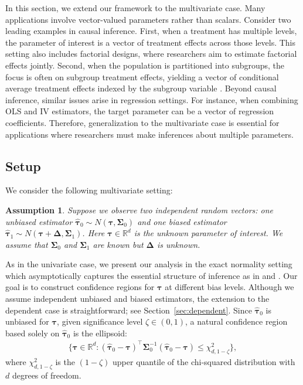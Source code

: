 \documentclass[11pt]{article}
\newcommand{\htau}{\widehat\tau}
\numberwithin{equation}{section}
\newtheorem{assumption}{Assumption}[section]
\theoremstyle{definition}
\begin{document}
In this section, we extend our framework to the multivariate case. Many applications involve vector-valued parameters rather than scalars. Consider two leading examples in causal inference. First, when a treatment has multiple levels, the parameter of interest is a vector of treatment effects across those levels. This setting also includes factorial designs, where researchers aim to estimate factorial effects jointly. Second, when the population is partitioned into subgroups, the focus is often on subgroup treatment effects, yielding a vector of conditional average treatment effects indexed by the subgroup variable \citep{schwartz2025harmonized}. Beyond causal inference, similar issues arise in regression settings. For instance, when combining OLS and IV estimators, the target parameter can be a vector of regression coefficients. Therefore, generalization to the multivariate case is essential for applications where researchers must make inferences about multiple parameters.

\subsection{Setup}

We consider the following multivariate setting:
\begin{assumption}\label{ass:normal_multi}
  Suppose we observe two independent random vectors: one unbiased estimator $\bm{\htau}_0 \sim N(\bm{\tau}, \bm{\Sigma}_0)$ and one biased estimator $\bm{\htau}_1 \sim N(\bm{\tau} + \bm{\Delta}, \bm{\Sigma}_1)$. Here $\bm{\tau} \in \mathbb{R}^d$ is the unknown parameter of interest. We assume that $\bm{\Sigma}_0$ and $\bm{\Sigma}_1$ are known but $\bm{\Delta}$ is unknown.
\end{assumption}

As in the univariate case, we present our analysis in the exact normality setting which asymptotically captures the essential structure of inference as in \cite{wald1943tests} and \cite{le1956asymptotic}. Our goal is to construct confidence regions for $\bm{\tau}$ at different bias levels. Although we assume independent unbiased and biased estimators, the extension to the dependent case is straightforward; see Section~\ref{sec:dependent}. Since $\bm{\htau}_0$ is unbiased for $\bm{\tau}$, given significance level $\zeta \in (0,1)$, a natural confidence region based solely on $\bm{\htau}_0$ is the ellipsoid:
\begin{align}
  \{\bm{\tau} \in \mathbb{R}^d : (\bm{\htau}_0 - \bm{\tau})^\top \bm{\Sigma}_0^{-1} (\bm{\htau}_0 - \bm{\tau}) \leq \chi^2_{d,1-\zeta}\},
\end{align}
where $\chi^2_{d,1-\zeta}$ is the $(1-\zeta)$ upper quantile of the chi-squared distribution with $d$ degrees of freedom.
\end{document}
